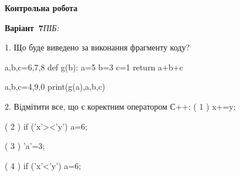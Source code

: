 \documentclass[11pt]{article}
\begin{document}
{\large\textbf{Контрольна робота}}

\textbf{Варіант \No\,7}\hfill \textit{ПІБ:}\,\underline{\hspace{60mm}}
\vspace{4mm}

1. Що буде виведено за виконання фрагменту коду?

a,b,c=6,7,8
def g(b):
    a=5
    b=3
    c=1
    return a+b+c

a,b,c=4,9,0
print(g(a),a,b,c)


2. %
Відмітити все, що є коректним оператором С++:
( 1 ) x+=y;

( 2 ) if ('x'><'y') a=6;

( 3 ) 'a'=3;

( 4 ) if ('x'<'y') a=6;


\newpage
\end{document}
